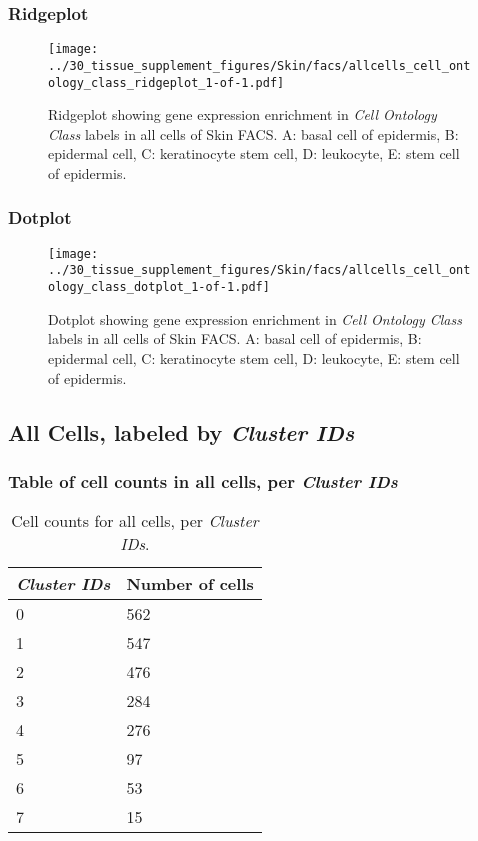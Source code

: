 \subsubsection{Ridgeplot}
\begin{figure}[h]
\centering
\texttt{[image: ../30\_tissue\_supplement\_figures/Skin/facs/allcells\_cell\_ontology\_class\_ridgeplot\_1-of-1.pdf]}

\caption{ Ridgeplot  showing gene expression enrichment in \emph{Cell Ontology Class} labels in all cells of Skin FACS. A: basal cell of epidermis, B: epidermal cell, C: keratinocyte stem cell, D: leukocyte, E: stem cell of epidermis.}
\end{figure}


\clearpage

\subsubsection{Dotplot}
\begin{figure}[h]
\centering
\texttt{[image: ../30\_tissue\_supplement\_figures/Skin/facs/allcells\_cell\_ontology\_class\_dotplot\_1-of-1.pdf]}

\caption{ Dotplot  showing gene expression enrichment in \emph{Cell Ontology Class} labels in all cells of Skin FACS. A: basal cell of epidermis, B: epidermal cell, C: keratinocyte stem cell, D: leukocyte, E: stem cell of epidermis.}
\end{figure}


\clearpage

\subsection{All Cells, labeled by \emph{Cluster IDs}}
\subsubsection{Table of cell counts in all cells, per \emph{Cluster IDs}}\begin{table}[h]
\centering
\label{my-label}
\begin{tabular}{@{}ll@{}}
\toprule

\emph{Cluster IDs}& Number of cells \\ \midrule
0 & 562 \\

1 & 547 \\

2 & 476 \\

3 & 284 \\

4 & 276 \\

5 & 97 \\

6 & 53 \\

7 & 15 \\
\bottomrule
\end{tabular}
\caption{Cell counts for all cells, per \emph{Cluster IDs}.}
\end{table}


